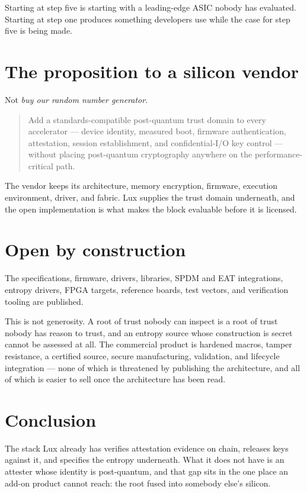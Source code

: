 \documentclass[11pt,a4paper]{article}
\begin{document}
Starting at step five is starting with a leading-edge ASIC nobody has evaluated.
Starting at step one produces something developers use while the case for step
five is being made.

\section{The proposition to a silicon vendor}

Not \emph{buy our random number generator}.

\begin{quote}
Add a standards-compatible post-quantum trust domain to every accelerator ---
device identity, measured boot, firmware authentication, attestation, session
establishment, and confidential-I/O key control --- without placing
post-quantum cryptography anywhere on the performance-critical path.
\end{quote}

The vendor keeps its architecture, memory encryption, firmware, execution
environment, driver, and fabric. Lux supplies the trust domain underneath, and
the open implementation is what makes the block evaluable before it is
licensed.

\section{Open by construction}

The specifications, firmware, drivers, libraries, SPDM and EAT integrations,
entropy drivers, FPGA targets, reference boards, test vectors, and verification
tooling are published.

This is not generosity. A root of trust nobody can inspect is a root of trust
nobody has reason to trust, and an entropy source whose construction is secret
cannot be assessed at all. The commercial product is hardened macros, tamper
resistance, a certified source, secure manufacturing, validation, and lifecycle
integration --- none of which is threatened by publishing the architecture, and
all of which is easier to sell once the architecture has been read.

\section{Conclusion}

The stack Lux already has verifies attestation evidence on chain, releases keys
against it, and specifies the entropy underneath. What it does not have is an
attester whose identity is post-quantum, and that gap sits in the one place an
add-on product cannot reach: the root fused into somebody else's silicon.
\end{document}
